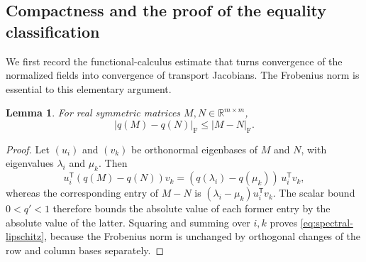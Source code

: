 \documentclass[11pt]{article}
\newtheorem{lemma}[theorem]{Lemma}
\theoremstyle{definition}
\theoremstyle{remark}
\numberwithin{equation}{section}
\begin{document}
\subsection{Compactness and the proof of the equality classification}

We first record the functional-calculus estimate that turns convergence
of the normalized fields into convergence of transport Jacobians.  The
Frobenius norm is essential to this elementary argument.

\begin{lemma}\label{lem:spectral-lipschitz}
For real symmetric matrices $M,N\in\mathbb R^{m\times m}$,
\begin{equation}\label{eq:spectral-lipschitz}
  |q(M)-q(N)|_{\mathrm F}\le |M-N|_{\mathrm F}.
\end{equation}
\end{lemma}

\begin{proof}
Let $(u_i)$ and $(v_k)$ be orthonormal eigenbases of $M$ and $N$, with
eigenvalues $\lambda_i$ and $\mu_k$.  Then
\[
  u_i^{\mathsf T}(q(M)-q(N))v_k
   =(q(\lambda_i)-q(\mu_k))\,u_i^{\mathsf T}v_k,
\]
whereas the corresponding entry of $M-N$ is
$(\lambda_i-\mu_k)u_i^{\mathsf T}v_k$.  The scalar bound $0<q'<1$
therefore bounds the absolute value of each former entry by the absolute
value of the latter.
Squaring and summing over $i,k$ proves \eqref{eq:spectral-lipschitz},
because the Frobenius norm is unchanged by orthogonal changes of the
row and column bases separately.
\end{proof}
\end{document}
